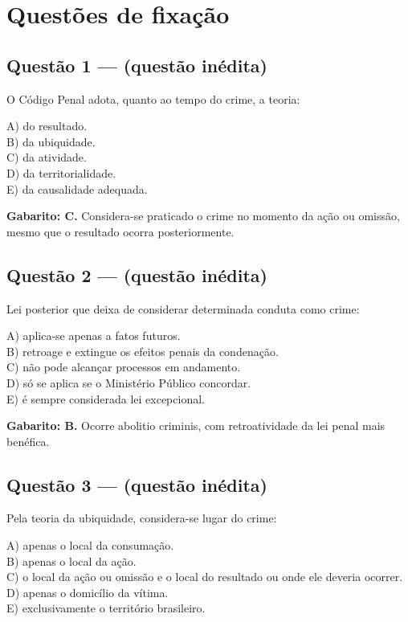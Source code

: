 \documentclass[11pt,a4paper]{article}
\begin{document}
\section*{Questões de fixação}

\subsection*{Questão 1 — (questão inédita)}

O Código Penal adota, quanto ao tempo do crime, a teoria:

A) do resultado. \\ B) da ubiquidade. \\ C) da atividade. \\ D) da territorialidade. \\ E) da causalidade adequada.

\begin{alerta}
\textbf{Gabarito: C.} Considera-se praticado o crime no momento da ação ou omissão, mesmo que o resultado ocorra posteriormente.
\end{alerta}

\subsection*{Questão 2 — (questão inédita)}

Lei posterior que deixa de considerar determinada conduta como crime:

A) aplica-se apenas a fatos futuros. \\ B) retroage e extingue os efeitos penais da condenação. \\ C) não pode alcançar processos em andamento. \\ D) só se aplica se o Ministério Público concordar. \\ E) é sempre considerada lei excepcional.

\begin{alerta}
\textbf{Gabarito: B.} Ocorre abolitio criminis, com retroatividade da lei penal mais benéfica.
\end{alerta}

\subsection*{Questão 3 — (questão inédita)}

Pela teoria da ubiquidade, considera-se lugar do crime:

A) apenas o local da consumação. \\ B) apenas o local da ação. \\ C) o local da ação ou omissão e o local do resultado ou onde ele deveria ocorrer. \\ D) apenas o domicílio da vítima. \\ E) exclusivamente o território brasileiro.
\end{document}
